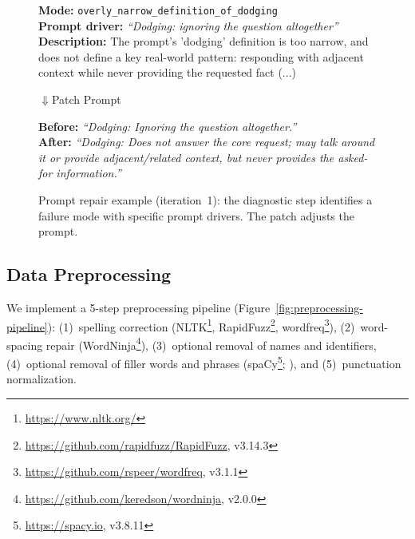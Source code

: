 \documentclass[11pt]{article}
\begin{document}
\begin{figure}[htbp]
\centering
\small
\begin{tcolorbox}[colback=orange!3,colframe=orange!80,title={\scriptsize\textbf{1.\ Diagnose: Failure Mode}},fonttitle=\sffamily,boxrule=0.4pt,left=3pt,right=3pt,top=2pt,bottom=2pt]
\scriptsize
\textbf{Mode:} \texttt{overly\_narrow\_definition\_of\_dodging}\\[2pt]
\textbf{Prompt driver:} \emph{``Dodging: ignoring the question altogether''}\\
\textbf{Description:} The prompt’s 'dodging' definition is too narrow, and does not define a key real-world pattern: responding with adjacent context while never providing the requested fact (...)\\[2pt]
\end{tcolorbox}
\vspace{1pt}
{\scriptsize$\Downarrow$\quad\textsf{Patch Prompt}}
\vspace{1pt}
\begin{tcolorbox}[colback=cyan!3,colframe=cyan!80,title={\scriptsize\textbf{2.\ Prompt Revision}},fonttitle=\sffamily,boxrule=0.4pt,left=3pt,right=3pt,top=2pt,bottom=2pt]
\scriptsize
\textbf{Before:} \emph{``Dodging: Ignoring the question altogether.''}\\[2pt]
\textbf{After:} \emph{``Dodging: Does not answer the core request; may talk around it or provide adjacent/related context, but never provides the asked-for information.''}\\[2pt]
\end{tcolorbox}
\caption{Prompt repair example (iteration~1): the diagnostic step identifies a failure mode with specific prompt drivers. The patch adjusts the prompt.}
\label{fig:prompt-repair-example}
\end{figure}

\subsection{Data Preprocessing}
We implement a 5-step preprocessing pipeline (Figure~\ref{fig:preprocessing-pipeline}):
(1)~spelling correction (NLTK\footnote{\url{https://www.nltk.org/}}, RapidFuzz\footnote{\url{https://github.com/rapidfuzz/RapidFuzz}, v3.14.3}, wordfreq\footnote{\url{https://github.com/rspeer/wordfreq}, v3.1.1}),
(2)~word-spacing repair (WordNinja\footnote{\url{https://github.com/keredson/wordninja}, v2.0.0}),
(3)~optional removal of names and identifiers,
(4)~optional removal of filler words and phrases (spaCy\footnote{\url{https://spacy.io}, v3.8.11}; \citealt{honnibal2020spacy}), and
(5)~punctuation normalization.
\end{document}
